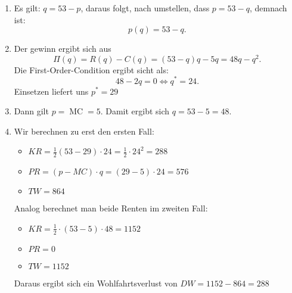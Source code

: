 \begin{solution}
    \begin{enumerate}
        \item Es gilt: $q=53-p$, daraus folgt, nach umstellen, dass $p=53-q$, demnach ist:
            \[
            p(q) = 53-q
            .\] 
        \item Der gewinn ergibt sich aus 
            \[
            \Pi(q) = R(q) -C(q) = (53-q)q - 5q = 48q-q^2
            .\] 
        Die First-Order-Condition ergibt sicht als:
        \[
        48-2q=0 \iff q^* = 24
        .\] 
        Einsetzen liefert uns $p^* = 29$ 
    \item Dann gilt $p = \operatorname{MC} = 5$. Damit ergibt sich $q=53-5=48$.  
    \item Wir berechnen zu erst den ersten Fall:
        \begin{itemize}
            \item $KR = \frac{1}{2}(53-29)\cdot 24 = \frac{1}{2} \cdot 24^2 = 288$
            \item $PR = (p-MC)\cdot q = (29-5)\cdot 24 = 576$ 
            \item $TW = 864$
        \end{itemize}
        Analog berechnet man beide Renten im zweiten Fall:
    \begin{itemize}
        \item $KR= \frac{1}{2} \cdot (53-5)\cdot 48 = 1152$
        \item $PR = 0$
        \item $TW= 1152$ 
    \end{itemize}
    Daraus ergibt sich ein Wohlfahrtsverlust von $DW= 1152-864 = 288$ 
    \end{enumerate}
    
\end{solution}

